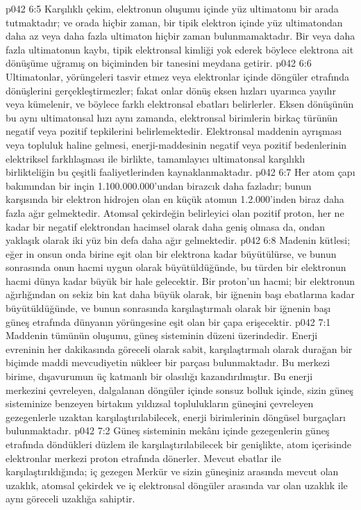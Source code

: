 \vs p042 6:5 Karşılıklı çekim, elektronun oluşumu içinde yüz ultimatonu bir arada tutmaktadır; ve orada hiçbir zaman, bir tipik elektron içinde yüz ultimatondan daha az veya daha fazla ultimaton hiçbir zaman bulunmamaktadır. Bir veya daha fazla ultimatonun kaybı, tipik elektronsal kimliği yok ederek böylece elektrona ait dönüşüme uğramış on biçiminden bir tanesini meydana getirir.
\vs p042 6:6 Ultimatonlar, yörüngeleri tasvir etmez veya elektronlar içinde döngüler etrafında dönüşlerini gerçekleştirmezler; fakat onlar dönüş eksen hızları uyarınca yayılır veya kümelenir, ve böylece farklı elektronsal ebatları belirlerler. Eksen dönüşünün bu aynı ultimatonsal hızı aynı zamanda, elektronsal birimlerin birkaç türünün negatif veya pozitif tepkilerini belirlemektedir. Elektronsal maddenin ayrışması veya topluluk haline gelmesi, enerji\hyp{}maddesinin negatif veya pozitif bedenlerinin elektriksel farklılaşması ile birlikte, tamamlayıcı ultimatonsal karşılıklı birlikteliğin bu çeşitli faaliyetlerinden kaynaklanmaktadır.
\vs p042 6:7 Her atom çapı bakımından bir inçin 1.100.000.000’undan birazcık daha fazladır; bunun karşısında bir elektron hidrojen olan en küçük atomun 1.2.000’inden biraz daha fazla ağır gelmektedir. Atomsal çekirdeğin belirleyici olan pozitif proton, her ne kadar bir negatif elektrondan hacimsel olarak daha geniş olmasa da, ondan yaklaşık olarak iki yüz bin defa daha ağır gelmektedir.
\vs p042 6:8 Madenin kütlesi; eğer in onsun onda birine eşit olan bir elektrona kadar büyütülürse, ve bunun sonrasında onun hacmi uygun olarak büyütüldüğünde, bu türden bir elektronun hacmi dünya kadar büyük bir hale gelecektir. Bir proton’un hacmi; bir elektronun ağırlığından on sekiz bin kat daha büyük olarak, bir iğnenin başı ebatlarına kadar büyütüldüğünde, ve bunun sonrasında karşılaştırmalı olarak bir iğnenin başı güneş etrafında dünyanın yörüngesine eşit olan bir çapa erişecektir.
\vs p042 7:1 Maddenin tümünün oluşumu, güneş sisteminin düzeni üzerindedir. Enerji evreninin her dakikasında göreceli olarak sabit, karşılaştırmalı olarak durağan bir biçimde maddi mevcudiyetin nükleer bir parçası bulunmaktadır. Bu merkezi birime, dışavurumun üç katmanlı bir olasılığı kazandırılmıştır. Bu enerji merkezini çevreleyen, dalgalanan döngüler içinde sonsuz bolluk içinde, sizin güneş sisteminize benzeyen birtakım yıldızsal toplulukların güneşini çevreleyen gezegenlerle uzaktan karşılaştırılabilecek, enerji birimlerinin döngüsel burgaçları bulunmaktadır.
\vs p042 7:2 Güneş sisteminin mekânı içinde gezegenlerin güneş etrafında döndükleri düzlem ile karşılaştırılabilecek bir genişlikte, atom içerisinde elektronlar merkezi proton etrafında dönerler. Mevcut ebatlar ile karşılaştırıldığında; iç gezegen Merkür ve sizin güneşiniz arasında mevcut olan uzaklık, atomsal çekirdek ve iç elektronsal döngüler arasında var olan uzaklık ile aynı göreceli uzaklığa sahiptir.
